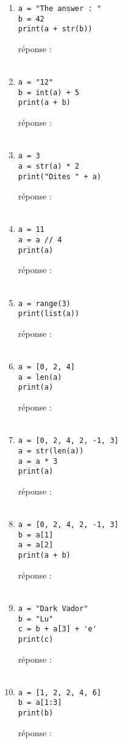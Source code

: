 \documentclass[12pt,a4paper]{article}
\newcommand{\response}{réponse : \hrulefill\\\\}
\begin{document}
\begin{enumerate}
\item
\begin{lstlisting}
a = "The answer : "
b = 42
print(a + str(b))
\end{lstlisting}
\response %
\pagebreak

\item
\begin{lstlisting}
a = "12"
b = int(a) + 5
print(a + b)
\end{lstlisting}
\response %

\item
\begin{lstlisting}
a = 3
a = str(a) * 2
print("Dites " + a)
\end{lstlisting}
\response %

\item
\begin{lstlisting}
a = 11
a = a // 4
print(a)
\end{lstlisting}
\response %

\item
\begin{lstlisting}
a = range(3) 
print(list(a))
\end{lstlisting}
\response %

\item
\begin{lstlisting}
a = [0, 2, 4]
a = len(a)
print(a) 
\end{lstlisting}
\response %
\pagebreak

\item
\begin{lstlisting}
a = [0, 2, 4, 2, -1, 3]
a = str(len(a))
a = a * 3
print(a) 
\end{lstlisting}
\response %

\item
\begin{lstlisting}
a = [0, 2, 4, 2, -1, 3]
b = a[1]
a = a[2] 
print(a + b) 
\end{lstlisting}
\response %

\item
\begin{lstlisting}
a = "Dark Vador"
b = "Lu"
c = b + a[3] + 'e' 
print(c) 
\end{lstlisting}
\response %

\item
\begin{lstlisting}
a = [1, 2, 2, 4, 6]
b = a[1:3]
print(b) 
\end{lstlisting}
\response %


\end{enumerate}
\end{document}
